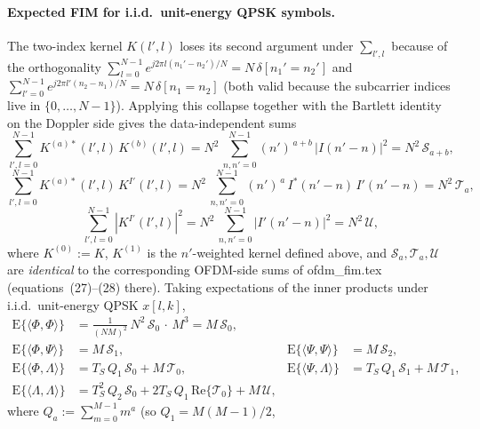 \documentclass[11pt]{article}
\begin{document}
\paragraph{Expected FIM for i.i.d.\ unit-energy QPSK symbols.} The
two-index kernel \(K(l',l)\) loses its second argument under
\(\sum_{l',l}\) because of the orthogonality
\(\sum_{l=0}^{N-1} e^{j2\pi l(n_1'-n_2')/N} = N\,\delta[n_1' = n_2']\)
and
\(\sum_{l'=0}^{N-1} e^{j2\pi l'(n_2-n_1)/N} = N\,\delta[n_1 = n_2]\)
(both valid because the subcarrier indices live in
\(\{0,\dots,N-1\}\)). Applying this collapse together with the Bartlett
identity on the Doppler side gives the data-independent sums
\begin{equation}
    \sum_{l',l=0}^{N-1} K^{(a)*}(l',l)\, K^{(b)}(l',l) = N^2\,
        \sum_{n,n'=0}^{N-1} (n')^{\,a+b}\, |I(n'-n)|^2 = N^2\,\mathcal{S}_{a+b},
\end{equation}
\begin{equation}
    \sum_{l',l=0}^{N-1} K^{(a)*}(l',l)\, K^{I'}(l',l) = N^2\,
        \sum_{n,n'=0}^{N-1} (n')^{\,a}\, I^*(n'-n)\, I'(n'-n) = N^2\,\mathcal{T}_a,
\end{equation}
\begin{equation}
    \sum_{l',l=0}^{N-1} |K^{I'}(l',l)|^2 = N^2\,
        \sum_{n,n'=0}^{N-1} |I'(n'-n)|^2 = N^2\,\mathcal{U},
\end{equation}
where \(K^{(0)} := K\), \(K^{(1)}\) is the \(n'\)-weighted kernel
defined above, and \(\mathcal{S}_a,\mathcal{T}_a,\mathcal{U}\) are
\emph{identical} to the corresponding OFDM-side sums of ofdm\_fim.tex
(equations~(27)--(28) there). Taking expectations of the inner
products under i.i.d.\ unit-energy QPSK \(x[l,k]\),
\begin{align}
    \mathrm{E}\{\langle \Phi,\Phi\rangle\} &=
        \tfrac{1}{(NM)^2}\,N^2\,\mathcal{S}_0\,\cdot\,M^3 = M\,\mathcal{S}_0, \\
    \mathrm{E}\{\langle \Phi,\Psi\rangle\} &= M\,\mathcal{S}_1, &
    \mathrm{E}\{\langle \Psi,\Psi\rangle\} &= M\,\mathcal{S}_2, \\
    \mathrm{E}\{\langle \Phi,\Lambda\rangle\} &=
        T_S\,Q_1\,\mathcal{S}_0 + M\,\mathcal{T}_0, &
    \mathrm{E}\{\langle \Psi,\Lambda\rangle\} &=
        T_S\,Q_1\,\mathcal{S}_1 + M\,\mathcal{T}_1, \\
    \mathrm{E}\{\langle \Lambda,\Lambda\rangle\} &=
        T_S^2\,Q_2\,\mathcal{S}_0 + 2 T_S\,Q_1\,\text{Re}\{\mathcal{T}_0\} + M\,\mathcal{U}, & &
\end{align}
where \(Q_a := \sum_{m=0}^{M-1} m^a\) (so \(Q_1 = M(M-1)/2\),
\end{document}
